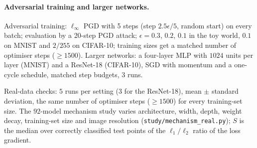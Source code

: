 \documentclass[11pt]{article}
\begin{document}
\paragraph{Adversarial training and larger networks.} Adversarial training: $\ell_\infty$ PGD with 5 steps (step $2.5\epsilon/5$, random start) on every batch; evaluation by a 20-step PGD attack; $\epsilon=0.3$, $0.2$, $0.1$ in the toy world, $0.1$ on MNIST and $2/255$ on CIFAR-10; training sizes get a matched number of optimiser steps ($\ge1500$). Larger networks: a four-layer MLP with $1024$ units per layer (MNIST) and a ResNet-18 (CIFAR-10), SGD with momentum and a one-cycle schedule, matched step budgets, 3 runs.

Real-data checks: $5$ runs per setting ($3$ for the ResNet-18), mean $\pm$ standard deviation, the same number of optimiser steps ($\ge1500$) for every training-set size. The $92$-model mechanism study varies architecture, width, depth, weight decay, training-set size and image resolution (\texttt{study/mechanism\_real.py}); $S$ is the median over correctly classified test points of the $\ell_1/\ell_2$ ratio of the loss gradient.
\end{document}
